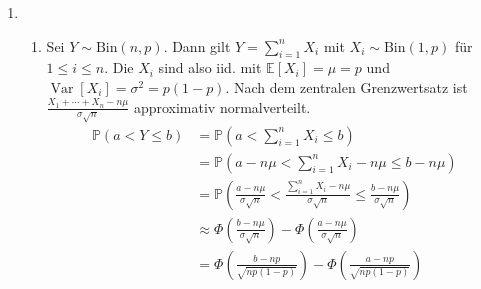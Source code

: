 \documentclass[a4paper]{scrartcl}
\newcommand{\prob}{\mathbb{P}}
\newcommand{\e}{\mathbb{E}}
\newcommand{\var}{\operatorname{Var}}
\def \blattnr {5}
\begin{document}
\begin{enumerate}[label=\bfseries \blattnr.\arabic*]
\begin{enumerate}
        \end{enumerate}
   
    \item
        \begin{enumerate}
            \item
                Sei $Y \sim \text{Bin}(n, p)$. Dann gilt $Y = \sum_{i=1}^n X_i$
                mit $X_i \sim \text{Bin}(1, p)$ für $1 \leq i \leq n$. Die
                $X_i$ sind also iid. mit $\e[X_i] = \mu = p$ und $\var[X_i] =
                \sigma^2 = p(1-p)$.
                Nach dem zentralen Grenzwertsatz ist $\frac{X_1 + \dotsb + X_n
                -n\mu}{\sigma\sqrt{n}}$ approximativ normalverteilt.
                \begin{equation*}
                    \begin{split}
                        \prob(a < Y \leq b)
                        &= \prob \left( a < \sum_{i=1}^n X_i \leq b \right) \\
                        &= \prob \left( a-n\mu < \sum_{i=1}^n X_i -n\mu \leq
                            b-n\mu \right) \\
                        &= \prob \left( \frac{a-n\mu}{\sigma\sqrt{n}} <
                            \frac{\sum_{i=1}^n X_i -n\mu}{\sigma\sqrt{n}} \leq
                            \frac{b-n\mu}{\sigma\sqrt{n}} \right) \\
                        &\approx \Phi \left( \frac{b-n\mu}{\sigma\sqrt{n}}
                            \right) - \Phi \left( \frac{a-n\mu}{\sigma\sqrt{n}}
                            \right) \\
                        &= \Phi \left( \frac{b-np}{\sqrt{np(1-p)}} \right) -
                            \Phi \left( \frac{a-np}{\sqrt{np(1-p)}} \right)
                    \end{split}
                \end{equation*}


\end{enumerate}
\end{enumerate}
\end{document}
